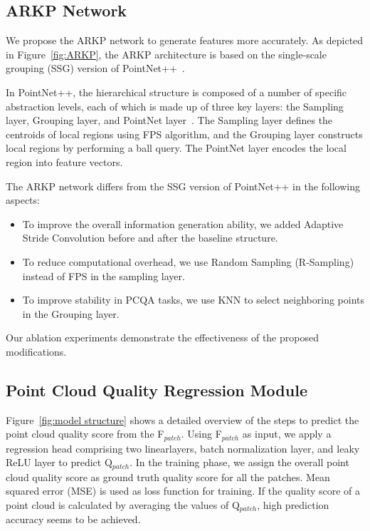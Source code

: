 \documentclass[conference]{IEEEtran}
\begin{document}
\subsection{ARKP Network}
We propose the ARKP network to generate features more accurately.
As depicted in Figure~\ref{fig:ARKP}, the ARKP architecture is based on the single-scale grouping (SSG) version of PointNet++~\cite{qi2017pointnet++}.

In PointNet++, the hierarchical structure is composed of a number of specific abstraction levels, each of which is made up of three key layers: the Sampling layer, Grouping layer, and PointNet layer~\cite{qi2017pointnet++}. The Sampling layer defines the centroids of local regions using FPS algorithm, and the Grouping layer constructs local regions by performing a ball query. The PointNet layer encodes the local region into feature vectors.

The ARKP network differs from the SSG version of PointNet++ in the following aspects:
\begin{itemize}
    \item To improve the overall information generation ability, we added Adaptive Stride Convolution before and after the baseline structure.
    \item To reduce computational overhead, we use Random Sampling (R-Sampling) instead of FPS in the sampling layer.
    \item To improve stability in PCQA tasks, we use KNN to select neighboring points in the Grouping layer.
\end{itemize}
Our ablation experiments demonstrate the effectiveness of the proposed modifications.



\subsection{Point Cloud Quality Regression Module}
Figure~\ref{fig:model structure} shows a detailed overview of the steps to predict the point cloud quality score from the F$_{patch}$. Using F$_{patch}$ as input, we apply a regression head comprising two linearlayers, batch normalization layer, and leaky ReLU layer to predict Q$_{patch}$. In the training phase, we assign the overall point cloud quality score as ground truth quality score for all the patches. Mean squared error (MSE) is used as loss function for training. If the quality score of a point cloud is calculated by averaging the values of Q$_{patch}$, high prediction accuracy seems to be achieved.
\end{document}
